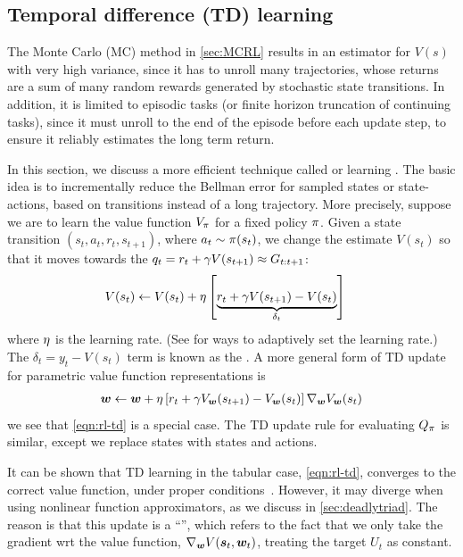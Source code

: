 \subsection{Temporal difference (TD) learning}
\label{sec:TD}

The Monte Carlo (MC) method in \cref{sec:MCRL}
results in 
an estimator for $V(s)$ with very high variance,
since it has to unroll many trajectories, 
whose returns are a sum of many random rewards generated by stochastic state transitions.
In addition, it is limited to episodic tasks
(or finite horizon truncation of continuing tasks),
since it must unroll to the end of the episode
before each update step,
to ensure it reliably estimates the long term return.

In this section, we discuss a more efficient technique called
 or  learning
\citep{Sutton88}.
The basic idea is to incrementally
reduce the Bellman error
for sampled states or state-actions,
based on transitions instead of a long trajectory.
More precisely, suppose we are to learn
the value function $V_{\pi}$ for a fixed policy $\pi$.
Given a state transition $(s_t,a_t,r_t,s_{t+1})$,
where $a_t \sim \pi(s_t)$,
we change the estimate $V(s_t)$ so that
it moves towards the  
$q_t = r_t + \gamma V(s_{t+1}) \approx G_{t:t+1}$:
\begin{align}
V(s_t) &\leftarrow V(s_t) + \eta
\left[
  \underbrace{r_t + \gamma V(s_{t+1}) - V(s_t)}_{\delta_t}
  \right]
\end{align}
where $\eta$ is the learning rate.
(See \citep{Ryzhov2015} for ways to adaptively set the learning rate.)
The $\delta_t=y_t - V(s_t)$ term 
is known as the .
A more general form of TD update
for parametric value function representations is
\begin{align}
\label{eqn:rl-td-approx}
{\bm{w}} \leftarrow {\bm{w}} + \eta \left[
r_t + \gamma V_{{\bm{w}}}(s_{t+1})
  - V_{{\bm{w}}}(s_t) \right] \nabla_{{\bm{w}}}V_{{\bm{w}}}(s_t)
\end{align}
we see that  \cref{eqn:rl-td} is a special case.
The TD update rule for evaluating $Q_{\pi}$ is similar,
except we replace states with states and actions.


It can be shown that TD learning in the tabular case,
\cref{eqn:rl-td}, converges to the correct value function,
under proper conditions~\citep{BertsekasRL}.
However, it may diverge when using nonlinear function approximators,
as we discuss in \cref{sec:deadlytriad}.
The reason is that this update is a
``'',
which refers to the fact
that we only take the gradient wrt the  value function,
$\nabla_{{\bm{w}}} V({\bm{s}}_t, {\bm{w}}_t)$,
treating the target $U_t$ as constant.

